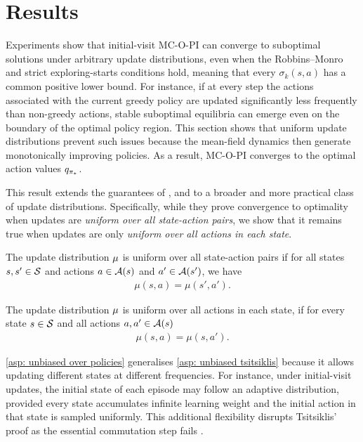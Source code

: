 \section{Results}
\label{sec: results}


%

Experiments show that initial-visit MC-O-PI can converge to suboptimal solutions under arbitrary update distributions, even when the Robbins–Monro 
and strict exploring-starts conditions hold, meaning that every $\sigma_k(s,a)$ has a common positive lower bound.
%
%
For instance, if at every step the actions associated with the current greedy policy are updated significantly less frequently than non-greedy actions, stable suboptimal equilibria can emerge even on the boundary of the optimal policy region.
%
This section shows that uniform update distributions prevent such issues because the mean-field dynamics then generate monotonically improving policies.
As a result, MC-O-PI converges to the optimal action values $q_{{\pi}_*}$.

This result extends the guarantees of \citet{Tsitsiklis2002OnIteration}, \citet{Chen2018OnProblem} and \citet{Liu2021OnStarts} to a broader and more practical class of update distributions.
Specifically, while they prove convergence to optimality when updates are \textit{uniform over all state-action pairs}, we show that it remains true when updates are only \textit{uniform over all actions in each state}.

\begin{definition}
\label{asp: unbiased tsitsiklis}
The update distribution $\mu$ is uniform over all state-action pairs
if for all states $s, s' \in \mathcal{S}$ and actions $a \in \mathcal{A}(s)$ and $a' \in \mathcal{A}(s')$, we have
\begin{align*}
    \mu(s, a) = \mu(s', a') .
\end{align*}
\end{definition}

\begin{definition}
\label{asp: unbiased over policies}
The update distribution $\mu$ is uniform over all actions in each state,
if for every state $s \in \mathcal{S}$ and all actions $a, a' \in \mathcal{A}(s)$
\begin{align*}
    \mu(s, a) = \mu(s, a') .
\end{align*}
\end{definition}

\autoref{asp: unbiased over policies} generalises \autoref{asp: unbiased tsitsiklis} because it allows updating different states at different frequencies.
For instance, under initial-visit updates, the initial state of each episode may follow an adaptive distribution, provided every state accumulates infinite learning weight and the initial action in that state is sampled uniformly.
This additional flexibility disrupts Tsitsiklis' proof as the essential commutation step fails \citep[p.~64]{Tsitsiklis2002OnIteration}.
%

